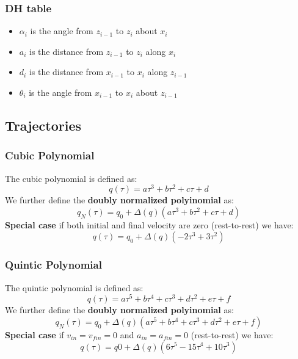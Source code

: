 \documentclass[a4paper,12pt]{article}
\begin{document}
\subsubsection{DH table}
\begin{itemize}
    \item $\alpha_i$ is the angle from $z_{i-1}$ to $z_i$ about $x_i$
    \item $a_i$ is the distance from $z_{i-1}$ to $z_i$ along $x_i$
    \item $d_i$ is the distance from $x_{i-1}$ to $x_i$ along $z_{i-1}$
    \item $\theta_i$ is the angle from $x_{i-1}$ to $x_i$ about $z_{i-1}$
\end{itemize}
\subsection{Trajectories} \label{sec:Trajectories}
\subsubsection{Cubic Polynomial}
The cubic polynomial is defined as:
\begin{equation}
    q(\tau)= a\tau^3+b\tau^2+c\tau+d
\end{equation}
We further define the \textbf{doubly normalized polyinomial} as:
\begin{equation}
    q_N(\tau)= q_0 + \Delta(q)(a\tau^3+b\tau^2+c\tau+d)
\end{equation}
\textbf{Special case} if both initial and final velocity are zero (rest-to-rest) we have:
\begin{equation}
    q(\tau)= q_0 + \Delta(q)(-2\tau^3+3\tau^2)
\end{equation}
\subsubsection{Quintic Polynomial}
The quintic polynomial is defined as:
\begin{equation}
    q(\tau)= a\tau^5+b\tau^4+c\tau^3+d\tau^2+e\tau+f
\end{equation}
We further define the \textbf{doubly normalized polyinomial} as:
\begin{equation}
    q_N(\tau)= q_0 + \Delta(q)(a\tau^5+b\tau^4+c\tau^3+d\tau^2+e\tau+f)
\end{equation}
\textbf{Special case} if $v_{in}=v_{fin}=0$ and $a_{in}=a_{fin}=0$ (rest-to-rest) we have:
\begin{equation}
    q(\tau)=q0 + \Delta(q)(6\tau^5-15\tau^4+10\tau^3)
\end{equation}
\end{document}
